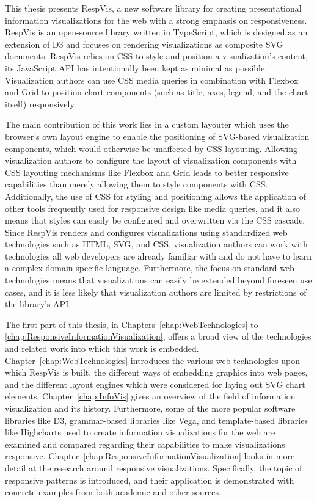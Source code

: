 This thesis presents RespVis, a new software library for creating
presentational information visualizations for the web with a strong
emphasis on responsiveness. RespVis is an open-source library
\parencite{RespVisGitHub} written in TypeScript, which is designed as
an extension of D3 and focuses on rendering visualizations as
composite SVG documents. RespVis relies on CSS to style and position a
visualization's content, its JavaScript API has intentionally been
kept as minimal as possible. Visualization authors can use CSS media
queries in combination with Flexbox and Grid to position chart
components (such as title, axes, legend, and the chart itself)
responsively.

The main contribution of this work lies in a custom layouter which
uses the browser's own layout engine to enable the positioning of
SVG-based visualization components, which would otherwise be
unaffected by CSS layouting. Allowing visualization authors to
configure the layout of visualization components with CSS layouting
mechanisms like Flexbox and Grid leads to better responsive
capabilities than merely allowing them to style components with CSS.
Additionally, the use of CSS for styling and positioning allows the
application of other tools frequently used for responsive design like
media queries, and it also means that styles can easily be configured
and overwritten via the CSS cascade. Since RespVis renders and
configures visualizations using standardized web technologies such as
HTML, SVG, and CSS, visualization authors can work with technologies
all web developers are already familiar with and do not have to learn
a complex domain-specific language. Furthermore, the focus on standard
web technologies means that visualizations can easily be extended
beyond foreseen use cases, and it is less likely that visualization
authors are limited by restrictions of the library's API.



The first part of this thesis, in Chapters~\ref{chap:WebTechnologies}
to \ref{chap:ResponsiveInformationVisualization}, offers a broad view
of the technologies and related work into which this work is
embedded. Chapter~\ref{chap:WebTechnologies} introduces the various
web technologies upon which RespVis is built, the different ways of
embedding graphics into web pages, and the different layout engines
which were considered for laying out SVG chart elements.
Chapter~\ref{chap:InfoVis} gives an overview of the field of
information visualization and its history. Furthermore, some of the
more popular software libraries like D3, grammar-based libraries like
Vega, and template-based libraries like Highcharts used to create
information visualizations for the web are examined and compared
regarding their capabilities to make visualizations responsive.
Chapter~\ref{chap:ResponsiveInformationVisualization} looks in more
detail at the research around responsive visualizations.
Specifically, the topic of responsive patterns is introduced, and
their application is demonstrated with concrete examples from both
academic and other sources.

